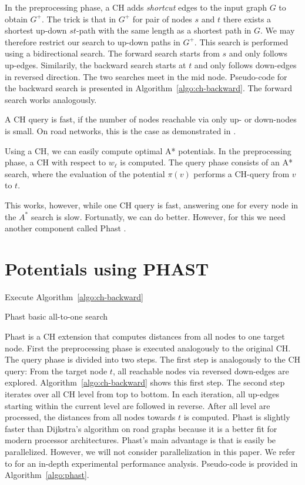\documentclass[a4paper,UKenglish,cleveref, autoref]{lipics-v2019}
\begin{document}
In the preprocessing phase, a CH adds \emph{shortcut} edges to the input graph $G$ to obtain $G^+$.
The trick is that in $G^+$ for pair of nodes $s$ and $t$ there exists a shortest up-down $st$-path with the same length as a shortest path in $G$.
We may therefore restrict our search to up-down paths in $G^+$.
This search is performed using a bidirectional search.
The forward search starts from $s$ and only follows up-edges.
Similarily, the backward search starts at $t$ and only follows down-edges in reversed direction.
The two searches meet in the mid node.
Pseudo-code for the backward search is presented in Algorithm~\ref{algo:ch-backward}.
The forward search works analogously.

A CH query is fast, if the number of nodes reachable via only up- or down-nodes is small.
On road networks, this is the case as demonstrated in \cite{ch,punch,crp,cch,flowcutter}.

Using a CH, we can easily compute optimal A* potentials.
In the preprocessing phase, a CH with respect to $w_\ell$ is computed.
The query phase consists of an A* search, where the evaluation of the potential $\pi(v)$ performs a CH-query from $v$ to $t$.

This works, however, while one CH query is fast, answering one for every node in the $A^*$ search is slow.
Fortunatly, we can do better.
However, for this we need another component called Phast \cite{Phast}.

\section{Potentials using PHAST}

\begin{algorithm2e}
Execute Algorithm~\ref{algo:ch-backward}\;
\caption{Phast basic all-to-one search}
\label{algo:phast}
\end{algorithm2e}

Phast \cite{Phast} is a CH extension that computes distances from all nodes to one target node.
First the preprocessing phase is executed analogously to the original CH.
The query phase is divided into two steps.
The first step is analogously to the CH query:
From the target node $t$, all reachable nodes via reversed down-edges are explored.
Algorithm~\ref{algo:ch-backward} shows this first step.
The second step iterates over all CH level from top to bottom.
In each iteration, all up-edges starting within the current level are followed in reverse.
After all level are processed, the distances from all nodes towards $t$ is computed.
Phast is slightly faster than Dijkstra's algorithm on road graphs because it is a better fit for modern processor architectures.
Phast's main advantage is that is easily be parallelized.
However, we will not consider parallelization in this paper.
We refer to \cite{Phast} for an in-depth experimental performance analysis.
Pseudo-code is provided in Algorithm~\ref{algo:phast}.
\end{document}
